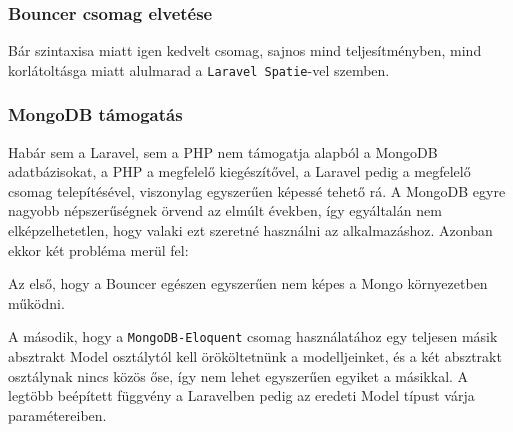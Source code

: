 \documentclass[a4paper,12pt]{thesis-ekf}
\theoremstyle{definition}
\begin{document}
		\subsubsection*{Bouncer csomag elvetése}
			Bár szintaxisa miatt igen kedvelt csomag, sajnos mind teljesítményben, mind korlátoltásga miatt alulmarad a \texttt{Laravel Spatie}-vel szemben. 
			
		\subsubsection*{MongoDB támogatás}
			Habár sem a Laravel, sem a PHP nem támogatja alapból a MongoDB adatbázisokat, a PHP a megfelelő kiegészítővel, a Laravel pedig a megfelelő csomag telepítésével, viszonylag egyszerűen képessé tehető rá. A MongoDB egyre nagyobb népszerűségnek örvend az elmúlt években, így egyáltalán nem elképzelhetetlen, hogy valaki ezt szeretné használni az alkalmazáshoz. Azonban ekkor két probléma merül fel:
			
			Az első, hogy a Bouncer egészen egyszerűen nem képes a Mongo környezetben működni.
			
			A második, hogy a \texttt{MongoDB-Eloquent} csomag használatához egy teljesen másik absztrakt Model osztálytól kell örököltetnünk a modelljeinket, és a két absztrakt osztálynak nincs közös őse, így nem lehet egyszerűen  egyiket a másikkal. A legtöbb beépített függvény a Laravelben pedig az eredeti Model típust várja paramétereiben.
		
\end{document}
